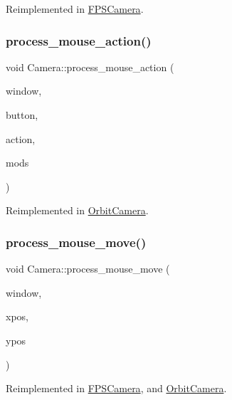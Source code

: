 Reimplemented in \hyperlink{classFPSCamera_a420a19fa966d3a9caceb81a519419780}{F\+P\+S\+Camera}.

\mbox{\label{classCamera_affd5e8a22d61e945ba56d2a807b98e61}} 
\subsubsection{\texorpdfstring{process\+\_\+mouse\+\_\+action()}{process\_mouse\_action()}}
{\footnotesize\ttfamily void Camera\+::process\+\_\+mouse\+\_\+action (\begin{DoxyParamCaption}\item[{G\+L\+F\+Wwindow $\ast$}]{window,  }\item[{int}]{button,  }\item[{int}]{action,  }\item[{int}]{mods }\end{DoxyParamCaption})\hspace{0.3cm}{\ttfamily [virtual]}}



Reimplemented in \hyperlink{classOrbitCamera_af8cb999454725d091971106c4a7bf715}{Orbit\+Camera}.

\mbox{\label{classCamera_abb67395d3094b766d86ad17cedc054c3}} 
\subsubsection{\texorpdfstring{process\+\_\+mouse\+\_\+move()}{process\_mouse\_move()}}
{\footnotesize\ttfamily void Camera\+::process\+\_\+mouse\+\_\+move (\begin{DoxyParamCaption}\item[{G\+L\+F\+Wwindow $\ast$}]{window,  }\item[{double}]{xpos,  }\item[{double}]{ypos }\end{DoxyParamCaption})\hspace{0.3cm}{\ttfamily [virtual]}}



Reimplemented in \hyperlink{classFPSCamera_a3e776ea7816c76d53a0f688c25c4c338}{F\+P\+S\+Camera}, and \hyperlink{classOrbitCamera_a73e280b9244dcbb6b8898a38d0243625}{Orbit\+Camera}.

